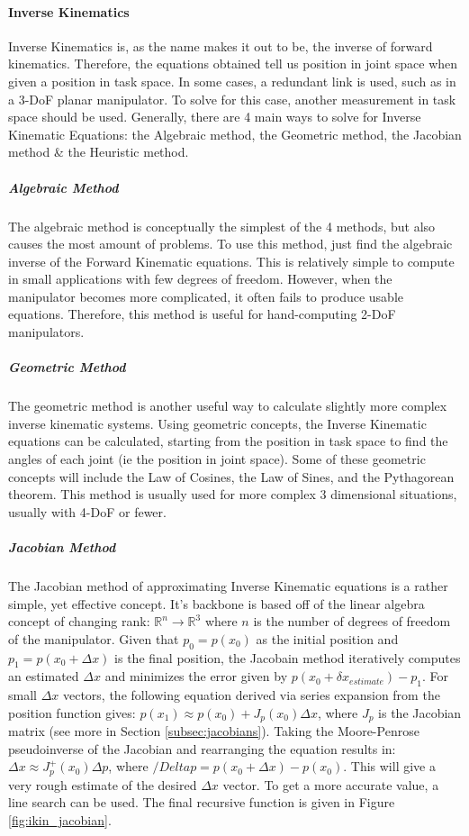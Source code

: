             \paragraph*{Inverse Kinematics}
            Inverse Kinematics is, as the name makes it out to be, the inverse of forward kinematics. Therefore, the equations obtained tell us position in joint space when given a position in task space. In some cases, a redundant link is used, such as in a 3-DoF planar manipulator. To solve for this case, another measurement in task space should be used. Generally, there are 4 main ways to solve for Inverse Kinematic Equations: the Algebraic method, the Geometric method, the Jacobian method \& the Heuristic method.
            \subparagraph*{Algebraic Method}
                The algebraic method is conceptually the simplest of the 4 methods, but also causes the most amount of problems. To use this method, just find the algebraic inverse of the Forward Kinematic equations. This is relatively simple to compute in small applications with few degrees of freedom. However, when the manipulator becomes more complicated, it often fails to produce usable equations. Therefore, this method is useful for hand-computing 2-DoF manipulators.
            \subparagraph*{Geometric Method}
                The geometric method is another useful way to calculate slightly more complex inverse kinematic systems. Using geometric concepts, the Inverse Kinematic equations can be calculated, starting from the position in task space to find the angles of each joint (ie the position in joint space). Some of these geometric concepts will include the Law of Cosines, the Law of Sines, and the Pythagorean theorem. This method is usually used for more complex 3 dimensional situations, usually with 4-DoF or fewer.
            \subparagraph*{Jacobian Method}
                The Jacobian method of approximating Inverse Kinematic equations is a rather simple, yet effective concept. It's backbone is based off of the linear algebra concept of changing rank: $\mathbb{R}^n \rightarrow \mathbb{R}^3$ where $n$ is the number of degrees of freedom of the manipulator. Given that $p_0 = p(x_0)$ as the initial position and $p_1 = p(x_0 + \Delta x)$ is the final position, the Jacobain method iteratively computes an estimated $\Delta x$ and minimizes the error given by $p(x_0 + \delta x_{estimate}) - p_1$. For small $\Delta x$ vectors, the following equation derived via series expansion from the position function gives: $p(x_1) \approx p(x_0) + J_p (x_0)\Delta x$, where $J_p$ is the Jacobian matrix (see more in Section \ref{subsec:jacobians}). Taking the Moore-Penrose pseudoinverse \cite{wikipedia_pseudoinverse} of the Jacobian and rearranging the equation results in: $\Delta x \approx J_p^+(x_0)\Delta p$, where $/Delta p = p(x_0 + \Delta x) - p(x_0)$. This will give a very rough estimate of the desired $\Delta x$ vector. To get a more accurate value, a line search can be used. The final recursive function is given in Figure \ref{fig:ikin_jacobian}. \cite{wikipedia_ikin}
